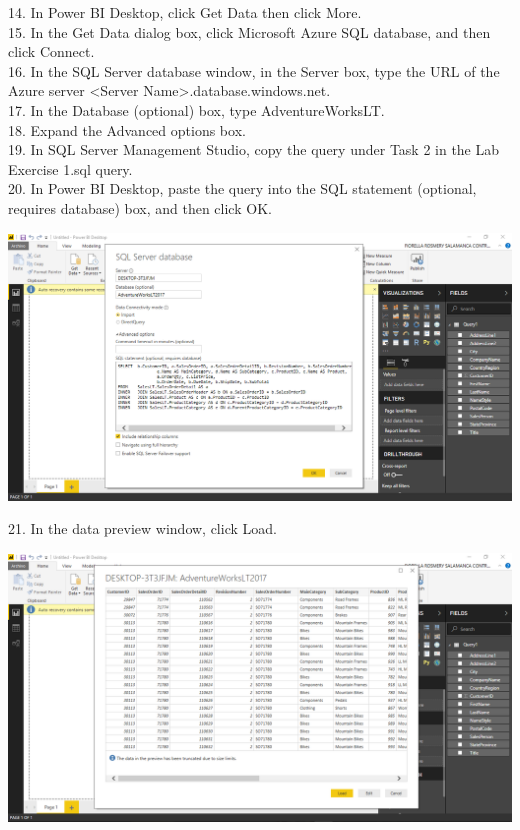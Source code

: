 14. In Power BI Desktop, click Get Data then click More.\\
15. In the Get Data dialog box, click Microsoft Azure SQL database, and then click Connect.\\
16. In the SQL Server database window, in the Server box, type the URL of the Azure server <Server Name>.database.windows.net.\\
17. In the Database (optional) box, type AdventureWorksLT.\\
18. Expand the Advanced options box.\\
19. In SQL Server Management Studio, copy the query under Task 2 in the Lab Exercise 1.sql query.\\
20. In Power BI Desktop, paste the query into the SQL statement (optional, requires database) box, and then click OK.\\

	\begin{center}
	\includegraphics[width=17cm]{./Imagenes/Ejercicio1/Tarea2/8}
	\end{center}	

21. In the data preview window, click Load.\\

	\begin{center}
	\includegraphics[width=17cm]{./Imagenes/Ejercicio1/Tarea2/9}
	\end{center}	


